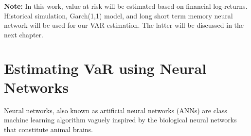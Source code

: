 \documentclass[a4paper,11pt,oneside]{book}
\begin{document}
\newline\newline
\textbf{Note:} In this work, value at risk will be estimated based on financial log-returns. Historical simulation, Garch(1,1) model, and long short term memory neural network will be used for our VAR estimation. The latter will be discussed in the next chapter.

\chapter{Estimating VaR using Neural Networks
}
Neural networks, also known as artificial neural networks (ANNs) are class machine learning algorithm vaguely inspired by the biological neural networks that constitute animal brains.\newline\newline
\end{document}
